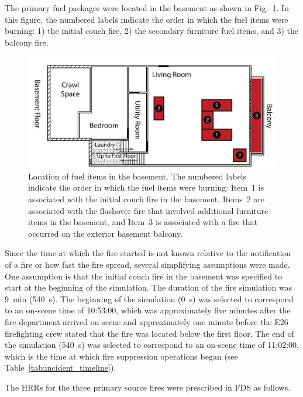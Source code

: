 \documentclass[12pt,oneside]{book}
\begin{document}
The primary fuel packages were located in the basement as shown in Fig.~\ref{fig:fuel_placement}. In this figure, the numbered labels indicate the order in which the fuel items were burning: 1) the initial couch fire, 2) the secondary furniture fuel items, and 3) the balcony fire.

\begin{figure}[!ht]
\includegraphics[width=6.5in]{../Figures/Plan_Basement_Fuels}
\caption[Location of fuel items in the basement.]
{Location of fuel items in the basement. The numbered labels indicate the order in which the fuel items were burning: Item~1 is associated with the initial couch fire in the basement, Items~2 are associated with the flashover fire that involved additional furniture items in the basement, and Item~3 is associated with a fire that occurred on the exterior basement balcony.}
\label{fig:fuel_placement}
\end{figure}


\clearpage


Since the time at which the fire started is not known relative to the notification of a fire or how fast the fire spread, several simplifying assumptions were made. One assumption is that the initial couch fire in the basement was specified to start at the beginning of the simulation. The duration of the fire simulation was 9~min (540~s). The beginning of the simulation (0~s) was selected to correspond to an on-scene time of 10:53:00, which was approximately five minutes after the fire department arrived on scene and approximately one minute before the E26 firefighting crew stated that the fire was located below the first floor. The end of the simulation (540~s) was selected to correspond to an on-scene time of 11:02:00, which is the time at which fire suppression operations began (see Table~\ref{tab:incident_timeline}).

The HRRs for the three primary source fires were prescribed in FDS as follows.
\end{document}
